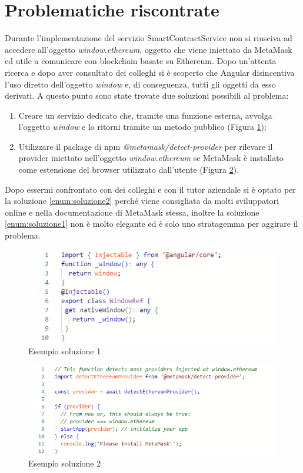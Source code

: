\section{Problematiche riscontrate}
Durante l'implementazione del servizio SmartContractService non si riusciva ad accedere all'oggetto \textit{window.ethereum}, oggetto che viene iniettato da MetaMask ed utile a comunicare con blockchain basate su Ethereum. Dopo un'attenta ricerca e dopo aver consultato dei colleghi si è scoperto che Angular disincentiva l'uso diretto dell'oggetto \textit{window} e, di conseguenza, tutti gli oggetti da esso derivati. A questo punto sono state trovate due soluzioni possibili al problema:
\begin{enumerate}
    \item \label{enum:soluzione1} Creare un servizio dedicato che, tramite una funzione esterna, avvolga l'oggetto \textit{window} e lo ritorni tramite un metodo pubblico (Figura \ref{fig:soluzione1});
    \item \label{enum:soluzione2} Utilizzare il package di npm \textit{@metamask/detect-provider} per rilevare il provider iniettato nell'oggetto \textit{window.ethereum} se MetaMask è installato come estensione del browser utilizzato dall'utente (Figura \ref{fig:soluzione2}).
\end{enumerate}
Dopo essermi confrontato con dei colleghi e con il tutor aziendale si è optato per la soluzione \ref{enum:soluzione2} perché viene consigliata da molti sviluppatori online e nella documentazione di MetaMask stessa, inoltre la soluzione \ref{enum:soluzione1} non è molto elegante ed è solo uno stratagemma per aggirare il problema.\cite{site:ethereum-provider}

\begin{figure}[!h] 
    \centering 
    \includegraphics[width=0.9\columnwidth]{immagini/soluzione1.png} 
    \caption{Esempio soluzione 1}
    \label{fig:soluzione1}
\end{figure}

\begin{figure}[!h] 
    \centering 
    \includegraphics[width=0.9\columnwidth]{immagini/soluzione2.png} 
    \caption{Esempio soluzione 2}
    \label{fig:soluzione2}
\end{figure}